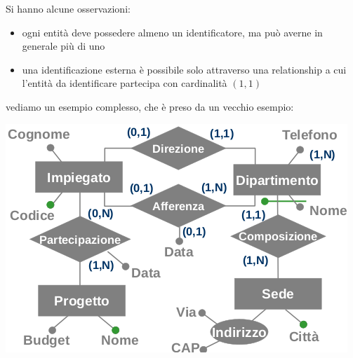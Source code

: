 \documentclass[a4paper,12pt, oneside]{book}
\begin{document}
Si hanno alcune osservazioni:
\begin{itemize}
\item ogni entità deve possedere almeno un
identificatore, ma può averne in generale più di uno
\item una identificazione esterna è possibile solo
attraverso una relationship a cui l'entità da
identificare partecipa con cardinalità $(1,1)$
\end{itemize}
vediamo un esempio complesso, che è preso da un vecchio esempio:
\begin{center}
\includegraphics[scale=0.8]{img/er14.png}
\end{center}
\end{document}
